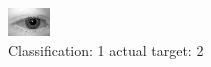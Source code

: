 \begin{figure}[h!]
\begin{center}
\includegraphics[width=0.60\columnwidth]{figures/ID499_class_1_target_2.png}
\end{center}
\caption{ Classification: 1 actual target: 2}
\label{fig:ID499_class_1_target_2}
\end{figure}

